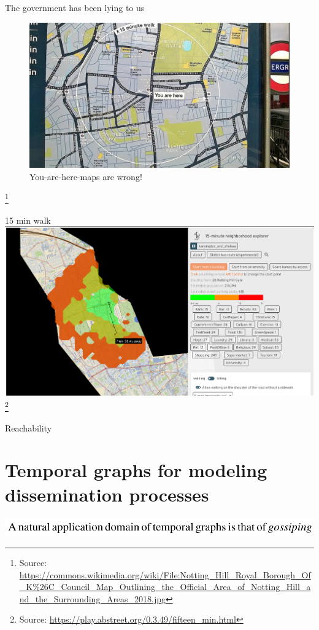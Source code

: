 \documentclass{beamer}
\newcommand{\sourcefootnote}[1]{\let\thefootnote\relax\footnote{{\tiny Source: \url{#1}}}}
\begin{document}
\begin{frame}{The government has been lying to us}
	\begin{figure}
		\includegraphics[width=0.9\linewidth]{media/image_1737738340.png}
		\caption{You-are-here-maps are wrong!}
	\end{figure}
	\sourcefootnote{https://commons.wikimedia.org/wiki/File:Notting_Hill_Royal_Borough_Of_K\%26C_Council_Map_Outlining_the_Official_Area_of_Notting_Hill_and_the_Surrounding_Areas_2018.jpg}
\end{frame}

\begin{frame}{15 min walk}
	\includegraphics[width=\linewidth]{media/15-min-walk.png}
	\sourcefootnote{https://play.abstreet.org/0.3.49/fifteen_min.html}
\end{frame}

\begin{frame}{Reachability}
	\begin{tcolorbox}[definitionstyle, title=Definition: Reachability]
	\end{tcolorbox}

\end{frame}


\section{Temporal graphs for modeling dissemination processes}
\begin{frame}
  \includegraphics[width=\linewidth]{media/gossip.png} \texttildelow{} \cite{Michail2015}
\end{frame}
\end{document}
